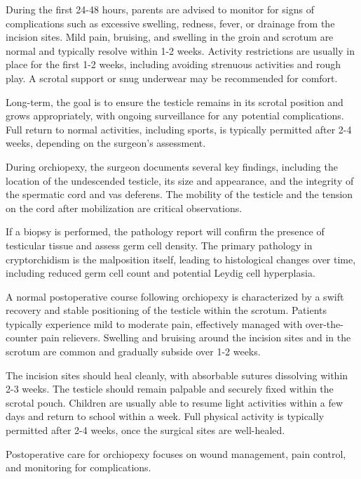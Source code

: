 During the first 24-48 hours, parents are advised to monitor for signs of complications such as excessive swelling, redness, fever, or drainage from the incision sites. Mild pain, bruising, and swelling in the groin and scrotum are normal and typically resolve within 1-2 weeks. Activity restrictions are usually in place for the first 1-2 weeks, including avoiding strenuous activities and rough play. A scrotal support or snug underwear may be recommended for comfort. 

Long-term, the goal is to ensure the testicle remains in its scrotal position and grows appropriately, with ongoing surveillance for any potential complications. Full return to normal activities, including sports, is typically permitted after 2-4 weeks, depending on the surgeon's assessment.

During orchiopexy, the surgeon documents several key findings, including the location of the undescended testicle, its size and appearance, and the integrity of the spermatic cord and vas deferens. The mobility of the testicle and the tension on the cord after mobilization are critical observations.

If a biopsy is performed, the pathology report will confirm the presence of testicular tissue and assess germ cell density. The primary pathology in cryptorchidism is the malposition itself, leading to histological changes over time, including reduced germ cell count and potential Leydig cell hyperplasia.

A normal postoperative course following orchiopexy is characterized by a swift recovery and stable positioning of the testicle within the scrotum. Patients typically experience mild to moderate pain, effectively managed with over-the-counter pain relievers. Swelling and bruising around the incision sites and in the scrotum are common and gradually subside over 1-2 weeks. 

The incision sites should heal cleanly, with absorbable sutures dissolving within 2-3 weeks. The testicle should remain palpable and securely fixed within the scrotal pouch. Children are usually able to resume light activities within a few days and return to school within a week. Full physical activity is typically permitted after 2-4 weeks, once the surgical sites are well-healed.

Postoperative care for orchiopexy focuses on wound management, pain control, and monitoring for complications.

